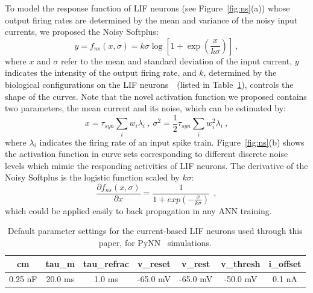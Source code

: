 \documentclass{article}
\begin{document}
	To model the response function of LIF neurons (see Figure~\ref{fig:ns}(a)) whose output firing rates are determined by the mean and variance of the noisy input currents, we proposed the Noisy Softplus:
	\begin{equation}
	y = f_{ns}(x, \sigma) = k \sigma \log [1 + \exp(\frac{x}{k \sigma})]~,
	\label{equ:nsp}
	\end{equation}
	where $x$ and $\sigma$ refer to the mean and standard deviation of the input current, $y$ indicates the intensity of the output firing rate, and $k$, determined by the biological configurations on the LIF neurons~\cite{liu2016noisy}~(listed in Table~\ref{tbl:pynnConfig}), controls the shape of the curves.
	Note that the novel activation function we proposed contains two parameters, the mean current and its noise, which can be estimated by:
	\begin{equation}
	x = \tau_{syn}\sum_i w_i\lambda_{i}~, ~\sigma^2=\frac{1}{2}\tau_{syn}\sum_i w_i^2\lambda_{i}~,
	\label{equ:distr}
	\end{equation}
	where $\lambda_i$ indicates the firing rate of an input spike train.
	Figure~\ref{fig:ns}(b) shows the activation function in curve sets corresponding to different discrete noise levels which mimic the responding activities of LIF neurons.
	The derivative of the Noisy Softplus is the logistic function scaled by $k\sigma$:
	\begin{equation}
	\frac{\partial f_{ns}(x,\sigma)}{\partial x} = \frac{1}{1+exp(-\frac{x}{k\sigma})}~~,
	\label{equ:logist}
	\end{equation}	
	which could be applied easily to back propagation in any ANN training.
	
	\begin{table}[thb]
		\centering
		\caption{\label{tbl:pynnConfig}Default parameter settings for the current-based LIF neurons used through this paper, for PyNN~\cite{davison2008pynn} simulations.}
		\bgroup
		\def\arraystretch{1.4}
		\begin{tabular}{c c c c c c c}
			cm & tau\_m & tau\_refrac & v\_reset & v\_rest& v\_thresh & i\_offset \\
			\hline
			0.25 nF & 20.0 ms & 1.0 ms & -65.0 mV & -65.0 mV & -50.0 mV &  0.1 nA 
		\end{tabular}
		\egroup
	\end{table}
	
\end{document}
